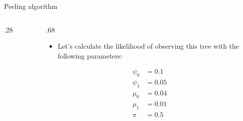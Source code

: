 \documentclass[9pt,ignorenonframetext,]{beamer}
\providecommand{\tightlist}{%
  \setlength{\itemsep}{0pt}\setlength{\parskip}{0pt}}
\newcommand{\includetikz}[2]{
\begin{figure}
\scalebox{#2}{

}
\end{figure}
}
\def\begincols{\begin{columns}[T]}
\def\begincol{\begin{column}[T]}
\def\endcol{\end{column}}
\def\endcols{\end{columns}}
\begin{document}
\begin{frame}[t]{Peeling algorithm}

\begincols

\begincol{.28\textwidth}

\includetikz{simple_tree.tex}{.6}

\endcol

\begincol{.68\textwidth}

\begin{itemize}
\tightlist
\item
  Let's calculate the likelihood of observing this tree with the
  following parameters:
\end{itemize}

\footnotesize

\normalsize

\[
\begin{aligned}
\psi_0 &= 0.1 \\
\psi_1 &= 0.05 \\
\mu_0  &= 0.04  \\
\mu_1  &= 0.01  \\
\pi    &= 0.5  \\
\end{aligned}
\]

\endcol

\endcols

\footnotesize

\normalsize

\end{frame}
\end{document}
